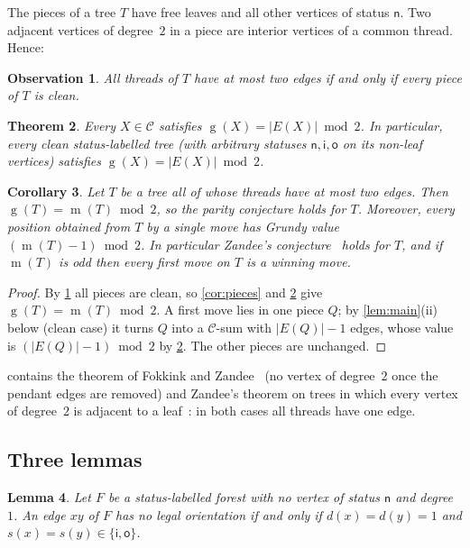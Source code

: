 \documentclass[11pt]{amsart}
\newtheorem{theorem}{Theorem}[section]
\newtheorem{lemma}[theorem]{Lemma}
\newtheorem{corollary}[theorem]{Corollary}
\newtheorem{observation}[theorem]{Observation}
\theoremstyle{definition}
\theoremstyle{remark}
\newcommand{\gv}{\operatorname{g}}           %
\newcommand{\m}{\operatorname{m}}
\newcommand{\sn}{\mathsf{n}}
\newcommand{\si}{\mathsf{i}}
\newcommand{\so}{\mathsf{o}}
\begin{document}
The pieces of a tree $T$ have free leaves and all other vertices of status $\sn$. Two adjacent
vertices of degree~$2$ in a piece are interior vertices of a common thread. Hence:

\begin{observation}\label{obs:clean}
All threads of $T$ have at most two edges if and only if every piece of $T$ is clean.
\end{observation}

\begin{theorem}\label{thm:clean}
Every $X\in\mathcal C$ satisfies $\gv(X)=|E(X)|\bmod 2$. In particular, every clean status-labelled
tree (with arbitrary statuses $\sn,\si,\so$ on its non-leaf vertices) satisfies $\gv(X)=|E(X)|\bmod 2$.
\end{theorem}

\begin{corollary}\label{cor:threads2}
Let $T$ be a tree all of whose threads have at most two edges. Then $\gv(T)=\m(T)\bmod 2$, so the
parity conjecture holds for $T$. Moreover, every position obtained from $T$ by a single move has
Grundy value $(\m(T)-1)\bmod 2$. In particular Zandee's conjecture~\cite[Conjecture~4.3]{Zandee2022}
holds for $T$, and if $\m(T)$ is odd then every first move on $T$ is a winning move.
\end{corollary}

\begin{proof}
By \cref{obs:clean} all pieces are clean, so \cref{cor:pieces} and \cref{thm:clean} give
$\gv(T)=\m(T)\bmod 2$. A first move lies in one piece $Q$; by \cref{lem:main}\textup{(ii)} below
(clean case) it turns $Q$ into a $\mathcal C$-sum with $|E(Q)|-1$ edges, whose value is
$(|E(Q)|-1)\bmod 2$ by \cref{thm:clean}. The other pieces are unchanged.
\end{proof}

 contains the theorem of Fokkink and Zandee~\cite[Theorem~1]{Fokkink2024} (no
vertex of degree~$2$ once the pendant edges are removed) and Zandee's theorem on trees in which every vertex of degree~$2$ is adjacent
to a leaf~\cite[Theorem~4.2]{Zandee2022}: in both cases all threads have one edge.

\subsection{Three lemmas}

\begin{lemma}\label{lem:deadchar}
Let $F$ be a status-labelled forest with no vertex of status $\sn$ and degree $1$. An edge $xy$ of
$F$ has no legal orientation if and only if $d(x)=d(y)=1$ and $s(x)=s(y)\in\{\si,\so\}$.
\end{lemma}
\end{document}
